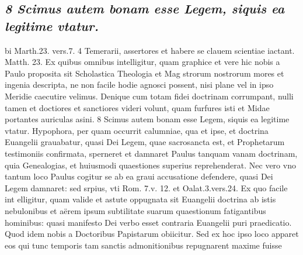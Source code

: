 \documentclass{article}
\begin{document}
\begin{pages}
\subsection*{\textit{8 Scimus autem bonam esse Legem, siquis ea legitime vtatur.}}bi Marth.23. vers.7. 4 Temerarii, assertores et habere se clauem scientiae iactant. Matth. 23. Ex quibus omnibus intelligitur, quam graphice et vere hic nobis a Paulo proposita sit Scholastica Theologia et Mag strorum nostrorum mores et ingenia descripta, ne non facile hodie agnosci possent, nisi plane vel in ipso Meridie caecutire velimus. Denique cum totam fidei doctrinam corrumpant, nulli tamen et doctiores et sanctiores videri volunt, quam furfures isti et Midae portantes auriculas asini. 8 Scimus autem bonam esse Legem, siquis ea legitime vtatur. Hypophora, per quam occurrit calumniae, qua et ipse, et doctrina Euangelii grauabatur, quasi Dei Legem, quae sacrosancta est, et Prophetarum testimoniis confirmata, sperneret et damnaret Paulus tanquam vanam doctrinam, quia Genealogias, et huiusmodi quaestiones superius reprehenderat. Nec vero vno tantum loco Paulus cogitur se ab ea graui accusatione defendere, quasi Dei Legem damnaret: sed srpius, vti Rom. 7.v. 12. et Oalat.3.vers.24. Ex quo facile int elligitur, quam valide et astute oppugnata sit Euangelii doctrina ab istis nebulonibus et aërem ipsum subtilitate suarum quaestionum fatigantibus hominibus: quasi manifesto Dei verbo esset contraria Euangelii puri praedicatio. Quod idem nobis a Doctoribus Papistarum obiicitur. Sed ex hoc ipso loco apparet eos qui tunc temporis tam sanctis admonitionibus repugnarent maxime fuisse  \pend

\end{pages}
\end{document}

